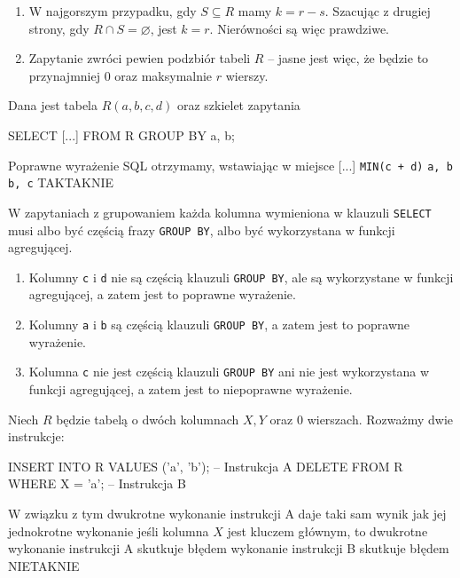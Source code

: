 \begin{solutions}
\begin{enumerate}[\bf A.]
    	\item W najgorszym przypadku, gdy $S \subseteq R$ mamy $k = r - s$. Szacując z drugiej strony, gdy $R \cap S = \varnothing$, jest $k = r$. Nierówności są więc prawdziwe.
    	
    	\item Zapytanie zwróci pewien podzbiór tabeli $R$ -- jasne jest więc, że będzie to przynajmniej 0 oraz maksymalnie $r$ wierszy.
    \end{enumerate}

    \sol Dana jest tabela $R(a,b,c,d)$ oraz szkielet zapytania 
    \begin{sql}
         SELECT [...]
         FROM R
         GROUP BY a, b;
    \end{sql}
    Poprawne wyrażenie SQL otrzymamy, wstawiając w miejsce [...]
    \answerss
    {\texttt{MIN(c + d)}}
    {\texttt{a, b}}
    {\texttt{b, c}}
    {TAK}{TAK}{NIE}

    W zapytaniach z grupowaniem każda kolumna wymieniona w klauzuli \texttt{SELECT} musi albo być częścią frazy \texttt{GROUP BY}, albo być wykorzystana w funkcji agregującej.
    
    \begin{enumerate}[\bf A.]
        \item Kolumny \texttt{c} i \texttt{d} nie są częścią klauzuli \texttt{GROUP BY}, ale są wykorzystane w funkcji agregującej, a zatem jest to poprawne wyrażenie.
        \item Kolumny \texttt{a} i \texttt{b} są częścią klauzuli \texttt{GROUP BY}, a zatem jest to poprawne wyrażenie.
        \item Kolumna \texttt{c} nie jest częścią klauzuli \texttt{GROUP BY} ani nie jest wykorzystana w funkcji agregującej, a zatem jest to niepoprawne wyrażenie.
    \end{enumerate}

    \sol Niech $R$ będzie tabelą o dwóch kolumnach $X, Y$ oraz 0 wierszach. Rozważmy dwie instrukcje:
    \begin{sql}
        INSERT INTO R VALUES ('a', 'b');    -- Instrukcja A
        DELETE FROM R WHERE X = 'a';        -- Instrukcja B
    \end{sql}
    W związku z tym
    \answerss
    {dwukrotne wykonanie instrukcji A daje taki sam wynik jak jej jednokrotne wykonanie}
    {jeśli kolumna $X$ jest kluczem głównym, to dwukrotne wykonanie instrukcji A skutkuje błędem}
    {wykonanie instrukcji B skutkuje błędem}
    {NIE}{TAK}{NIE}


\end{solutions}
